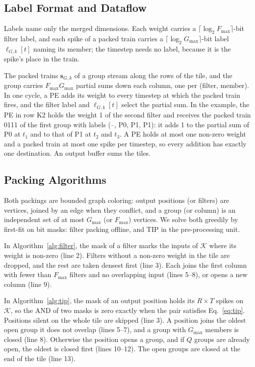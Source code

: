 \subsection{Label Format and Dataflow}
\label{sec:pack-format}
Labels name only the merged dimensions. Each weight carries a $\lceil \log_2 F_{\max} \rceil$-bit filter label,
and each spike of a packed train carries a $\lceil \log_2 G_{\max} \rceil$-bit label $\ell_{G,k}[t]$ naming its
member; the timestep needs no label, because it is the spike's place in the train.

The packed trains $\hat{\mathbf{s}}_{G,k}$ of a group stream along the rows of the tile, and the group carries
$F_{\max} G_{\max}$ partial sums down each column, one per (filter, member). In one cycle, a PE adds its weight to
every timestep at which the packed train fires, and the filter label and $\ell_{G,k}[t]$ select the partial sum.
In the example, the PE in row K2 holds the weight 1 of the second filter and receives the packed train 0111 of
the first group with labels (--, P0, P1, P1): it adds 1 to the partial sum of P0 at $t_1$ and to that of P1 at
$t_2$ and $t_3$. A PE holds at most one non-zero weight and a packed train at most one spike per timestep, so
every addition has exactly one destination. An output buffer sums the tiles.

\subsection{Packing Algorithms}
\label{sec:pack-alg}
Both packings are bounded graph coloring: output positions (or filters) are vertices, joined
by an edge when they conflict, and a group (or column) is an independent set of at most $G_{\max}$ (or $F_{\max}$)
vertices. We solve both greedily by first-fit on bit masks: filter packing offline, and TIP in the pre-processing
unit.

In Algorithm~\ref{alg:filter}, the mask of a filter marks the inputs of $\mathcal{K}$ where its weight is non-zero
(line 2). Filters without a non-zero weight in the tile are dropped, and the rest are taken densest first
(line 3). Each joins the first column with fewer than $F_{\max}$ filters and no overlapping input (lines 5--8), or
opens a new column (line 9).

In Algorithm~\ref{alg:tip}, the mask of an output position holds its $R \times T$ spikes on $\mathcal{K}$, so the
AND of two masks is zero exactly when the pair satisfies Eq.~\eqref{eq:tip}. Positions silent on the whole tile are
skipped (line 3). A position joins the oldest open group it does not overlap (lines 5--7), and a group with
$G_{\max}$ members is closed (line 8). Otherwise the position opens a group, and if $Q$ groups are already open,
the oldest is closed first (lines 10--12). The open groups are closed at the end of the tile (line 13).

